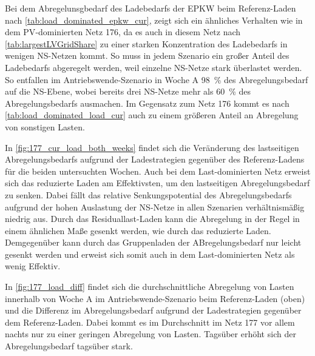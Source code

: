 



Bei dem Abregelunsgbedarf des Ladebedarfs der \gls{EPKW} beim Referenz-Laden nach \autoref{tab:load_dominated_epkw_cur}, zeigt sich ein ähnliches Verhalten wie in dem \gls{PV}-dominierten Netz \num{176}, da es auch in diesem Netz nach \autoref{tab:largestLVGridShare} zu einer starken Konzentration des Ladebedarfs in wenigen \gls{NS}-Netzen kommt.
So muss in jedem Szenario ein großer Anteil des Ladebedarfs abgeregelt werden, weil einzelne \gls{NS}-Netze stark überlastet werden.
So entfallen im Antriebswende-Szenario in Woche A \SI{98}{\percent} des Abregelungsbedarf auf die \gls{NS}-Ebene, wobei bereits drei \gls{NS}-Netze mehr als \SI{60}{\percent} des Abregelungsbedarfs ausmachen.
Im Gegensatz zum Netz \num{176} kommt es nach \autoref{tab:load_dominated_load_cur} auch zu einem größeren Anteil an Abregelung von sonstigen Lasten.





In \autoref{fig:177_cur_load_both_weeks} findet sich die Veränderung des lastseitigen Abregelungsbedarfs aufgrund der Ladestrategien gegenüber des Referenz-Ladens für die beiden untersuchten Wochen.
Auch bei dem Last-dominierten Netz erweist sich das reduzierte Laden am Effektivsten, um den lastseitigen Abregelungsbedarf zu senken.
Dabei fällt das relative Senkungspotential des Abregelungsbedarfs aufgrund der hohen Auslastung der \gls{NS}-Netze in allen Szenarien verhältnismäßig niedrig aus.
Durch das Residuallast-Laden kann die Abregelung in der Regel in einem ähnlichen Maße gesenkt werden, wie durch das reduzierte Laden.
Demgegenüber kann durch das Gruppenladen der ABregelungsbedarf nur leicht gesenkt werden und erweist sich somit auch in dem Last-dominierten Netz als wenig Effektiv.



In \autoref{fig:177_load_diff} findet sich die durchschnittliche Abregelung von Lasten innerhalb von Woche A im Antriebswende-Szenario beim Referenz-Laden (oben) und die Differenz im Abregelungsbedarf aufgrund der Ladestrategien gegenüber dem Referenz-Laden.
Dabei kommt es im Durchschnitt im Netz \num{177} vor allem nachts nur zu einer geringen Abregelung von Lasten.
Tagsüber erhöht sich der Abregelungsbedarf tagsüber stark.\medskip

